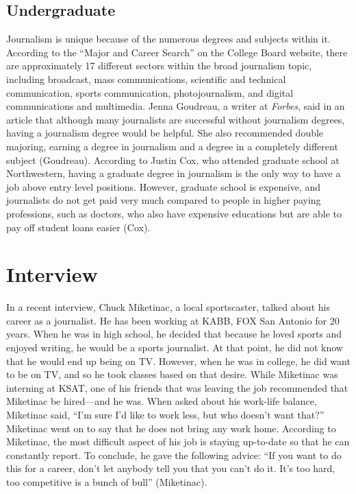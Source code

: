 \begin{multicols}{2}
    \subsection{Undergraduate}
Journalism is unique because of the numerous degrees and subjects within it. According to the “Major and Career Search” on the College Board website, there are approximately 17 different sectors within the broad journalism topic, including broadcast, mass communications, scientific and technical communication, sports communication, photojournalism, and digital communications and multimedia. Jenna Goudreau, a writer at \textit{Forbes}, said in an article that although many journalists are successful without journalism degrees, having a journalism degree would be helpful. She also recommended double majoring, earning a degree in journalism and a degree in a completely different subject (Goudreau). According to Justin Cox, who attended graduate school at Northwestern, having a graduate degree in journalism is the only way to have a job above entry level positions. However, graduate school is expensive, and journalists do not get paid very much compared to people in higher paying professions, such as doctors, who also have expensive educations but are able to pay off student loans easier (Cox). 
\section{Interview}
    In a recent interview, Chuck Miketinac, a local sportscaster, talked about his career as a journalist. He has been working at KABB, FOX San Antonio for 20 years. When he was in high school, he decided that because he loved sports and enjoyed writing, he would be a sports journalist. At that point, he did not know that he would end up being on TV. However, when he was in college, he did want to be on TV, and so he took classes based on that desire. While Miketinac was interning at KSAT, one of his friends that was leaving the job recommended that Miketinac be hired—and he was. When asked about his work-life balance, Miketinac said, “I'm sure I'd like to work less, but who doesn't want that?” Miketinac went on to say that he does not bring any work home. According to Miketinac, the most difficult aspect of his job is staying up-to-date so that he can constantly report. To conclude, he gave the following advice: “If you want to do this for a career, don't let anybody tell you that you can't do it. It's too hard, too competitive is a bunch of bull” (Miketinac).

\end{multicols}
